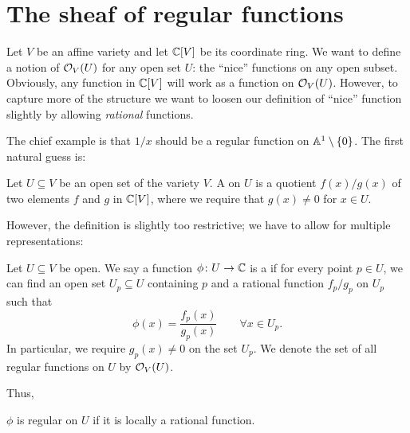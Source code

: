 \section{The sheaf of regular functions}

Let $V$ be an affine variety and let $\mathbb C[V]$ be its coordinate ring.
We want to define a notion of $\mathcal O_V(U)$ for any open set $U$:
the ``nice'' functions on any open subset.
Obviously, any function in $\mathbb C[V]$ will work as a function on $\mathcal O_V(U)$.
However, to capture more of the structure we want to
loosen our definition of ``nice'' function slightly
by allowing \emph{rational} functions.

The chief example is that $1/x$ should be a regular function
on $\mathbb A^1 \setminus \{0\}$.
The first natural guess is:
\begin{definition}
	Let $U \subseteq V$ be an open set of the variety $V$.
	A  on $U$
	is a quotient $f(x) / g(x)$ of two elements $f$ and $g$ in $\mathbb C[V]$,
	where we require that $g(x) \neq 0$ for $x \in U$.
\end{definition}
However, the definition is slightly too restrictive;
we have to allow for multiple representations:
\begin{definition}
	Let $U \subseteq V$ be open.
	We say a function $\phi \colon U \to \mathbb C$ is a  if for
	every point $p \in U$, we can find an open set $U_p \subseteq U$ containing $p$
	and a rational function $f_p/g_p$ on $U_p$ such that
	\[ \phi(x) = \frac{f_p(x)}{g_p(x)} \qquad \forall x \in U_p. \]
	In particular, we require $g_p(x) \neq 0$ on the set $U_p$.
	We denote the set of all regular functions on $U$ by $\mathcal O_V(U)$.
\end{definition}

Thus,
\begin{moral}
	$\phi$ is regular on $U$ if it is locally a rational function.
\end{moral}

